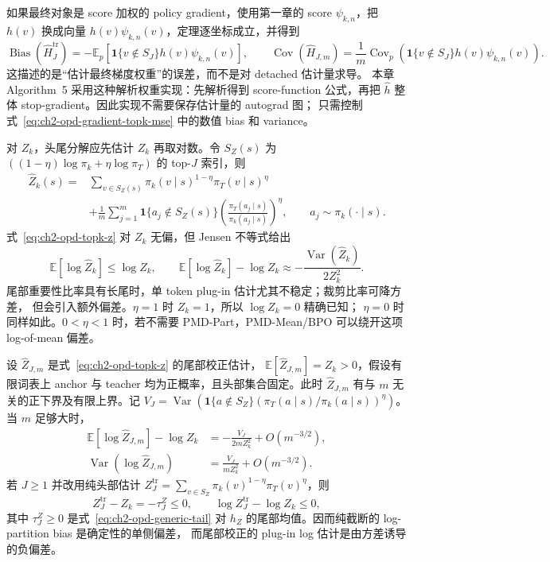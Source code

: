 如果最终对象是 score 加权的 policy gradient，使用第一章的 score $\psi_{k,n}$，把
$h(v)$ 换成向量 $h(v)\psi_{k,n}(v)$，定理逐坐标成立，并得到
\begin{equation}
\operatorname{Bias}(\widehat H_J^{\mathrm{tr}})
 =-\mathbb E_p[\mathbf 1\{v\notin S_J\}h(v)\psi_{k,n}(v)],
\qquad
\operatorname{Cov}(\widehat H_{J,m})
 =\frac1m\operatorname{Cov}_p(\mathbf 1\{v\notin S_J\}h(v)\psi_{k,n}(v)).
\label{eq:ch2-opd-gradient-topk-mse}
\end{equation}
这描述的是“估计最终梯度权重”的误差，而不是对 detached 估计量求导。
本章 Algorithm~5 采用这种解析权重实现：先解析得到 score-function 公式，再把
$\widehat h$ 整体 stop-gradient。因此实现不需要保存估计量的 autograd 图；
只需控制式~\eqref{eq:ch2-opd-gradient-topk-mse} 中的数值 bias 和 variance。

对 $Z_k$，头尾分解应先估计 $Z_k$ 再取对数。令
$S_Z(s)$ 为 $((1-\eta)\log\pi_k+\eta\log\pi_T)$ 的 top-$J$ 索引，则
\begin{align}
\widehat Z_k(s)
={}&\sum_{v\in S_Z(s)}\pi_k(v\mid s)^{1-\eta}\pi_T(v\mid s)^\eta\\
&+\frac1m\sum_{j=1}^{m}\mathbf 1\{a_j\notin S_Z(s)\}
\left(\frac{\pi_T(a_j\mid s)}{\pi_k(a_j\mid s)}\right)^\eta,
\qquad a_j\sim\pi_k(\cdot\mid s).
\label{eq:ch2-opd-topk-z}
\end{align}
式~\eqref{eq:ch2-opd-topk-z} 对 $Z_k$ 无偏，但 Jensen 不等式给出
\begin{equation}
\mathbb E[\log\widehat Z_k]\leq\log Z_k,
\qquad
\mathbb E[\log\widehat Z_k]-\log Z_k
\approx-\frac{\operatorname{Var}(\widehat Z_k)}{2Z_k^2}.
\end{equation}
尾部重要性比率具有长尾时，单 token plug-in 估计尤其不稳定；裁剪比率可降方差，
但会引入额外偏差。$\eta=1$ 时 $Z_k=1$，所以 $\log Z_k=0$ 精确已知；
$\eta=0$ 时同样如此。$0<\eta<1$ 时，若不需要 PMD-Part，PMD-Mean/BPO
可以绕开这项 log-of-mean 偏差。

\begin{theorem}
\label{thm:ch2-opd-logz-delta}
设 $\widehat Z_{J,m}$ 是式~\eqref{eq:ch2-opd-topk-z} 的尾部校正估计，
$\mathbb E[\widehat Z_{J,m}]=Z_k>0$，假设有限词表上 anchor 与 teacher 均为正概率，且头部集合固定。此时 $\widehat Z_{J,m}$ 有与 $m$ 无关的正下界及有限上界。记
$V_{J}=\operatorname{Var}(\mathbf 1\{a\notin S_Z\}
(\pi_T(a\mid s)/\pi_k(a\mid s))^\eta)$。当 $m$ 足够大时，
\begin{align}
\mathbb E[\log\widehat Z_{J,m}]-\log Z_k
&=-\frac{V_J}{2mZ_k^2}+O(m^{-3/2}),\\
\operatorname{Var}(\log\widehat Z_{J,m})
&=\frac{V_J}{mZ_k^2}+O(m^{-3/2}).
\end{align}
若 $J\ge1$ 并改用纯头部估计 $Z_J^{\mathrm{tr}}=\sum_{v\in S_Z}
\pi_k(v)^{1-\eta}\pi_T(v)^\eta$，则
\begin{equation}
Z_J^{\mathrm{tr}}-Z_k=-\tau_J^Z\le0,
\qquad
\log Z_J^{\mathrm{tr}}-\log Z_k\le0,
\end{equation}
其中 $\tau_J^Z\ge0$ 是式~\eqref{eq:ch2-opd-generic-tail} 对
$h_Z$ 的尾部均值。因而纯截断的 log-partition bias 是确定性的单侧偏差，
而尾部校正的 plug-in log 估计是由方差诱导的负偏差。
\end{theorem}

